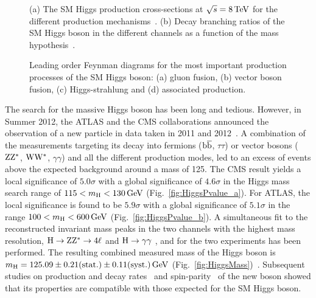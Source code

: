 \begin{figure}[!htb]
\centering
{}
\caption{(a) The SM Higgs production cross-sections at $\sqrt{s} = 8\,\text{Te\hspace{-.08em}V}$ for the different production mechanisms~\cite{Dittmaier:2011ti}. (b) Decay branching ratios of the SM Higgs boson in the different channels as a function of the mass hypothesis~\cite{Dittmaier:2011ti}.}
\label{fig:HiggsXS}
\end{figure}

\begin{figure}[!htb]
\centering
{}
\caption{Leading order Feynman diagrams for the most important production processes of the SM Higgs boson: (a) gluon fusion, (b) vector boson fusion, (c) Higgs-strahlung and (d) \ttbar associated production.}
\label{fig:HiggsProd}
\end{figure}

The search for the massive Higgs boson has been long and tedious. 
However, in Summer 2012, the ATLAS and the CMS collaborations announced the observation of a new particle in data taken in 2011 and 2012~\cite{Chatrchyan:2013lba,Aad:2012tfa}.
A combination of the measurements targeting its decay into fermions (${\mathrm{b}\overline{\mathrm{b}}}$, $\tau\tau$) or vector bosons ($\mathrm{Z}\mathrm{Z}^*$, $\mathrm{W}\mathrm{W}^*$, $\gamma\gamma$) and all the different production modes, led to an excess of events above the expected background around a mass of 125\GeV.
The CMS result yields a local significance of $5.0\sigma$ with a global significance of $4.6\sigma$ in the Higgs mass search range of $115 < m_\mathrm{H} < 130\,\text{Ge\hspace{-.08em}V}$ (Fig.~\ref{fig:HiggsPvalue_a}).
For ATLAS, the local significance is found to be $5.9\sigma$ with a global significance of $5.1\sigma$ in the range $100 < m_\mathrm{H} < 600\,\text{Ge\hspace{-.08em}V}$ (Fig.~\ref{fig:HiggsPvalue_b}).
A simultaneous fit to the reconstructed invariant mass peaks in the two channels with the highest mass resolution, $\mathrm{H} \to \mathrm{Z}\mathrm{Z}^* \to 4\ell$ and $\mathrm{H} \to \gamma\gamma$ , and for the two experiments has been performed.
The resulting combined measured mass of the Higgs boson is $m_\mathrm{H} = 125.09 \pm 0.21 \mbox{(stat.)} \pm 0.11 \mbox{(syst.)} \,\text{Ge\hspace{-.08em}V}$ (Fig.~\ref{fig:HiggsMass})~\cite{Aad:2015zhl}.
Subsequent studies on production and decay rates~\cite{Khachatryan:2016vau} and spin-parity~\cite{Aad:2015mxa,Chatrchyan:2012jja,Khachatryan:2014kca} of the new boson showed that its properties are compatible with those expected for the SM Higgs boson. 

